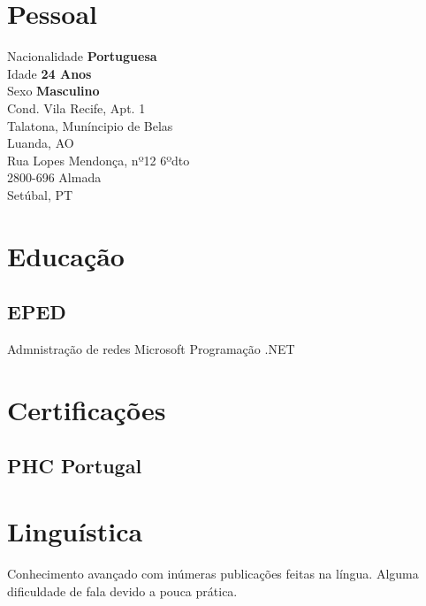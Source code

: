 \documentclass[letterpaper]{deedy-resume} %
\begin{document}
\begin{minipage}[t]{0.33\textwidth}

\section{Pessoal} 

Nacionalidade \textbf{Portuguesa}\\
Idade \textbf{24 Anos}\\
Sexo \textbf{Masculino}\\

Cond. Vila Recife, Apt. 1\\
Talatona, Muníncipio de Belas\\
Luanda, AO\\
\sectionspace{}
Rua Lopes Mendonça, nº12 6ºdto\\
2800-696 Almada\\
Setúbal, PT\\

\sectionspace

\section{Educação}
\subsection{EPED}
Admnistração de redes Microsoft
Programação .NET

\sectionspace

\section{Certificações}
\subsection{PHC Portugal}

\sectionspace

\section{Linguística}
Conhecimento avançado com inúmeras publicações feitas na língua. Alguma dificuldade de fala devido a pouca prática.


\end{minipage}
\end{document}
